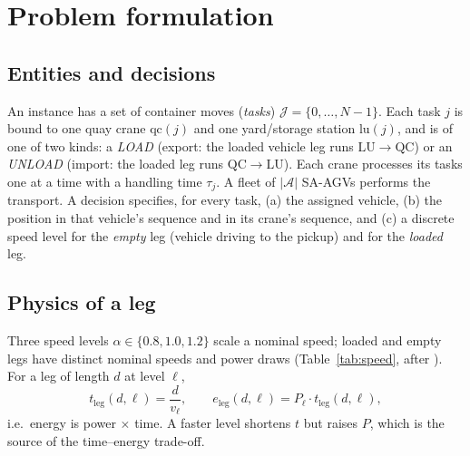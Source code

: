 \documentclass[11pt]{article}
\begin{document}
\section{Problem formulation}
\label{sec:problem}

\subsection{Entities and decisions}
An instance has a set of container moves (\emph{tasks}) $\mathcal{J}=\{0,\dots,N-1\}$.
Each task $j$ is bound to one quay crane $\mathrm{qc}(j)$ and one yard/storage station
$\mathrm{lu}(j)$, and is of one of two kinds: a \emph{LOAD} (export: the loaded vehicle leg
runs $\mathrm{LU}\!\to\!\mathrm{QC}$) or an \emph{UNLOAD} (import: the loaded leg runs
$\mathrm{QC}\!\to\!\mathrm{LU}$). Each crane processes its tasks one at a time with a
handling time $\tau_j$. A fleet of $|\mathcal{A}|$ SA-AGVs performs the transport. A
decision specifies, for every task, (a) the assigned vehicle, (b) the position in that
vehicle's sequence and in its crane's sequence, and (c) a discrete speed level for the
\emph{empty} leg (vehicle driving to the pickup) and for the \emph{loaded} leg.

\subsection{Physics of a leg}
Three speed levels $\alpha\in\{0.8,1.0,1.2\}$ scale a nominal speed; loaded and empty legs
have distinct nominal speeds and power draws (Table~\ref{tab:speed}, after
\cite{homayouni2022book,fontes2022mpbrkga}). For a leg of length $d$ at level $\ell$,
\begin{equation}
t_{\text{leg}}(d,\ell) = \frac{d}{v_\ell}, \qquad
e_{\text{leg}}(d,\ell) = P_\ell \cdot t_{\text{leg}}(d,\ell),
\end{equation}
i.e.\ energy is power $\times$ time. A faster level shortens $t$ but raises $P$, which is
the source of the time--energy trade-off.

\begin{table}[t]
\centering
\caption{Kinematic and power constants per speed level (after \cite{homayouni2022book}).}
\label{tab:speed}
\small
{}
\end{table}
\end{document}
